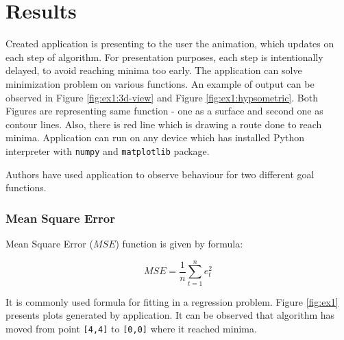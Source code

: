 \documentclass[11pt,a4paper]{IEEEtran}
\begin{document}
\section{Results}
Created application is presenting to the user the animation, which updates on each step of algorithm. For presentation purposes, each step is intentionally delayed, to avoid reaching minima too early.
The application can solve minimization problem on various functions. An example of output can be observed in Figure \ref{fig:ex1:3d-view} and Figure \ref{fig:ex1:hypsometric}. Both Figures are representing same function - one as a surface and second one as contour lines. Also, there is red line which is drawing a route done to reach minima.
Application can run on any device which has installed Python interpreter with \texttt{numpy} and \texttt{matplotlib} package.

Authors have used application to observe behaviour for two different goal functions.
\\

\subsubsection{Mean Square Error}
Mean Square Error ($MSE$) function is given by formula:

$$ MSE = \frac{1}{n}\sum_{t=1}^{n}e_t^2 $$

It is commonly used formula for fitting in a regression problem. Figure \ref{fig:ex1} presents plots generated by application. It can be observed that algorithm has moved from point \texttt{[4,4]} to \texttt{[0,0]} where it reached minima.
\end{document}
